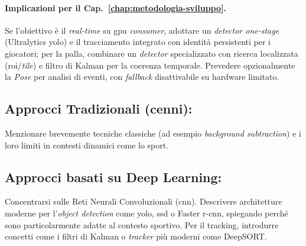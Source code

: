 \documentclass[12pt,a4paper,openright,twoside]{book}
\begin{document}
\paragraph{Implicazioni per il Cap.~\ref{chap:metodologia-sviluppo}.}
Se l'obiettivo è il \emph{real-time} su \ac{gpu} \emph{consumer}, adottare 
un \emph{detector one-stage} (Ultralytics \ac{yolo}) e il tracciamento integrato 
con identità persistenti per i giocatori; per la palla, combinare un \emph{detector} 
specializzato con ricerca localizzata (\ac{roi}/\emph{tile}) e filtro di Kalman per 
la coerenza temporale. Prevedere opzionalmente la \emph{Pose} per analisi di eventi, 
con \emph{fallback} disattivabile su hardware limitato. 


\subsection{Approcci Tradizionali (cenni):}
\label{sec:approcci-tradizionali}
Menzionare brevemente tecniche classiche (ad esempio \emph{background subtraction}) 
e i loro limiti in contesti dinamici come lo sport.

\subsection{Approcci basati su Deep Learning:}
\label{sec:approcci-deep-learning}
Concentrarsi sulle Reti Neurali Convoluzionali (\ac{cnn}). Descrivere architetture 
moderne per l'\emph{object detection} come \ac{yolo}, \ac{ssd} o Faster \ac{r-cnn}, 
spiegando perché sono particolarmente adatte al contesto sportivo. 
Per il tracking, introdurre concetti come i filtri di Kalman o \emph{tracker} più moderni 
come DeepSORT.


\end{document}
